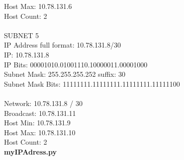 \documentclass[10pt, a4paper]{article}%
\begin{document}
Host Max: 10.78.131.6\\
Host Count: 2\\
\\
SUBNET 5\\
IP Address full format: 10.78.131.8/30\\
IP: 10.78.131.8\\
IP Bits: 00001010.01001110.10000011.00001000\\
Subnet Mask: 255.255.255.252 suffix: 30\\
Subnet Mask Bits: 11111111.11111111.11111111.11111100\\
\\
Network: 10.78.131.8 / 30\\
Broadcast: 10.78.131.11\\
Host Min: 10.78.131.9\\
Host Max: 10.78.131.10\\
Host Count: 2\\
\clearpage
\noindent  \textbf{myIPAdress.py}

\end{document}
